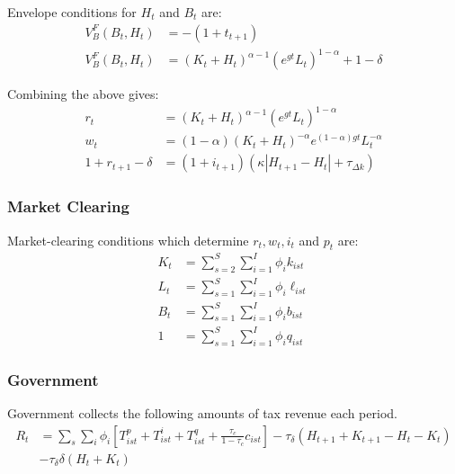 \documentclass[letterpaper,12pt]{article}
\theoremstyle{definition}
\numberwithin{equation}{section}
\begin{document}
\begin{spacing}{1.5}
      Envelope conditions for $H_t$ and $B_t$ are:
      \begin{align}
      V^F_B(B_{t},H_{t}) & = -(1+t_{t+1}) \nonumber \\
      V^F_B(B_{t},H_{t}) & = (K_t+H_t)^{\alpha-1}(e^{gt}L_t)^{1-\alpha} + 1 - \delta \nonumber 
      \end{align}

      Combining the above gives:
      \begin{align}
      r_t & = (K_t+H_t)^{\alpha-1}(e^{gt}L_t)^{1-\alpha} \label{Macro_CorpTax_FirmCond1}\\
      w_t & = (1-\alpha) (K_t+H_t)^{-\alpha}e^{(1-\alpha)gt}L_t^{-\alpha} \label{Macro_CorpTax_FirmCond2}\\
      1 + r_{t+1} - \delta & = (1+i_{t+1}) \left( \kappa \left|H_{t+1} - H_{t}\right| + \tau_{\Delta k} \right) \label{Macro_CorpTax_FirmCond3}
      \end{align}

    \subsubsection{Market Clearing}
      Market-clearing conditions which determine $r_t, w_t, i_t$ and $p_t$ are:
      \begin{align}
      K_t & = \sum_{s=2}^S \sum_{i=1}^I \phi_i k_{ist} \label{Macro_CorpTax_Clear1}\\
      L_t & = \sum_{s=1}^S \sum_{i=1}^I \phi_i \ell_{ist} \label{Macro_CorpTax_Clear2}\\
      B_t & = \sum_{s=1}^S \sum_{i=1}^I \phi_i b_{ist} \label{Macro_CorpTax_Clear3}\\
      1 & = \sum_{s=1}^S \sum_{i=1}^I \phi_i q_{ist} \label{Macro_CorpTax_Clear4}
      \end{align}  

    \subsubsection{Government}
      Government collects the following amounts of tax revenue each period.
      \begin{equation} \label{Macro_CorpTax_GovRev}
      \begin{split}
      R_t & = \sum_s \sum_i \phi_i \left[ T^p_{ist} + T^i_{ist} + T^q_{ist} + \tfrac{\tau_c}{1-\tau_c} c_{ist}\right] - \tau_\delta (H_{t+1} + K_{t+1} - H_t - K_t) \\
      & - \tau_\delta \delta (H_t + K_t)
      \end{split}
      \end{equation}


\end{spacing}
\end{document}
